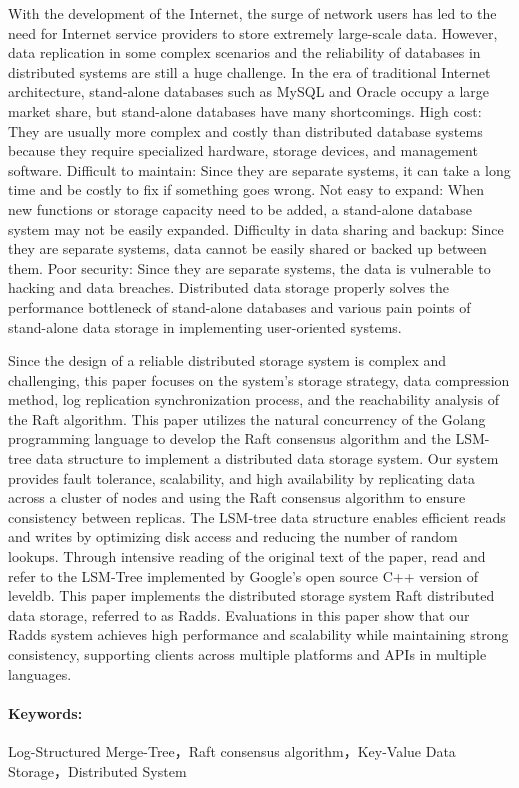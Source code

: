 With the development of the Internet, the surge of network users has led to the need for Internet service providers to store extremely large-scale data. However, data replication in some complex scenarios and the reliability of databases in distributed systems are still a huge challenge.
In the era of traditional Internet architecture, stand-alone databases such as MySQL and Oracle occupy a large market share, but stand-alone databases have many shortcomings.
High cost: They are usually more complex and costly than distributed database systems because they require specialized hardware, storage devices, and management software.
Difficult to maintain: Since they are separate systems, it can take a long time and be costly to fix if something goes wrong.
Not easy to expand: When new functions or storage capacity need to be added, a stand-alone database system may not be easily expanded.
Difficulty in data sharing and backup: Since they are separate systems, data cannot be easily shared or backed up between them.
Poor security: Since they are separate systems, the data is vulnerable to hacking and data breaches.
Distributed data storage properly solves the performance bottleneck of stand-alone databases and various pain points of stand-alone data storage in implementing user-oriented systems.


Since the design of a reliable distributed storage system is complex and challenging, this paper focuses on the system's storage strategy, data compression method, log replication synchronization process, and the reachability analysis of the Raft algorithm.
This paper utilizes the natural concurrency of the Golang programming language to develop the Raft consensus algorithm and the LSM-tree data structure to implement a distributed data storage system.
Our system provides fault tolerance, scalability, and high availability by replicating data across a cluster of nodes and using the Raft consensus algorithm to ensure consistency between replicas.
The LSM-tree data structure enables efficient reads and writes by optimizing disk access and reducing the number of random lookups.
Through intensive reading of the original text of the paper, read and refer to the LSM-Tree implemented by Google's open source C++ version of leveldb. This paper implements the distributed storage system Raft distributed data storage, referred to as Radds.
Evaluations in this paper show that our Radds system achieves high performance and scalability while maintaining strong consistency, supporting clients across multiple platforms and APIs in multiple languages.

\paragraph{Keywords: }Log-Structured Merge-Tree，Raft consensus algorithm，Key-Value Data Storage，Distributed System






